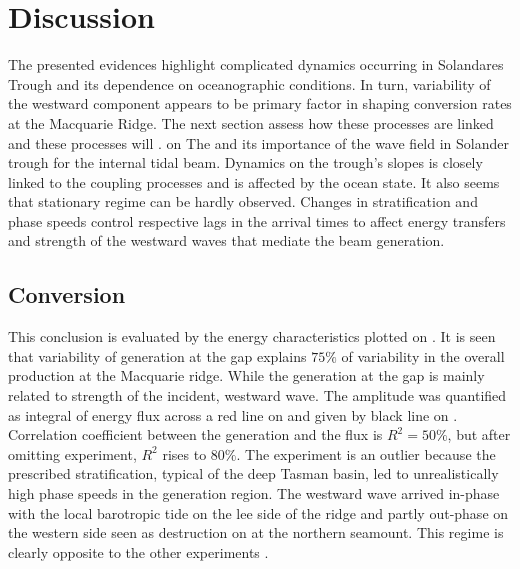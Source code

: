 \documentclass[12pt]{article}
\begin{document}
\section{Discussion}
\label{C3.sec:disc}

The presented evidences highlight complicated dynamics occurring in Solandares 
Trough and its dependence on oceanographic conditions. In turn, 
variability of the westward component appears to be primary factor in shaping conversion rates at 
the Macquarie Ridge. The next section assess how these processes are linked and   these 
processes will . on 
The  and its  
importance of the wave field in Solander 
trough for 
the internal 
tidal beam. Dynamics on the trough's slopes is closely linked to the coupling processes and is 
affected by the ocean state. It also seems that stationary regime can be hardly observed. Changes 
in stratification and phase speeds control respective lags in the arrival times to affect energy 
transfers and strength of the westward waves that mediate the beam generation.\\

\subsection{Conversion}
\label{C3.sec:disc_conv}
This conclusion is evaluated by the energy characteristics plotted on 
. It is seen that variability of generation at the gap explains  
$75\%$ of variability in the overall production at the Macquarie ridge. While the generation at the 
gap is mainly related to strength of the incident, westward wave. The amplitude was 
quantified as integral of energy flux across a red line on  and 
given by black line on . Correlation coefficient between the 
generation and the flux is $R^2 = 50\%$, but after omitting  experiment, $R^2$ rises 
to $80\%$. The  experiment is an outlier because the prescribed stratification,  
typical of the deep Tasman basin, led to unrealistically high phase speeds in the 
generation region. The westward wave arrived in-phase with the local barotropic tide on the 
lee side of the ridge and partly out-phase on the western side seen as destruction on 
 at the northern seamount. This regime 
is clearly opposite to the other experiments .\\
\end{document}
